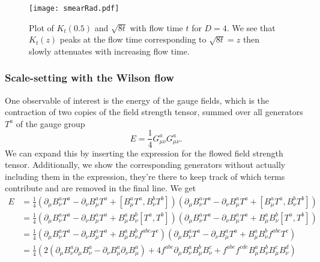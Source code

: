 \documentclass[a4paper,10pt]{article}
\begin{document}
\begin{figure}[H]
\centering

\texttt{[image: smearRad.pdf]}
\caption[]{Plot of $K_t(0.5)$ and $\sqrt{8t}$ with flow time $t$ for $D=4$. We see that $K_t(z)$ peaks at the flow time corresponding to $\sqrt{8t}=z$ then slowly attenuates with increasing flow time. }\label{fig:flowTimeMeanSquareRadius}
\end{figure}

\subsubsection{Scale-setting with the Wilson flow}
One observable of interest is the energy of the gauge fields, which is the contraction of two copies of the field strength tensor, summed over all generators $T^a$ of the gauge group 
\begin{equation}\label{eq:energyDensity_continuum}
E=\frac{1}{4} G_{\mu \nu}^{a} G_{\mu \nu}^{a}.
\end{equation}
We can expand this by inserting the expression for the flowed field strength tensor. Additionally, we show the corresponding generators without actually including them in the expression, they're there to keep track of which terms contribute and are removed in the final line. We get
\begin{equation}
\begin{aligned} 
E&=\frac{1}{4} \left( \partial_{\mu} B^{a}_{\nu}T^{a}-\partial_{\nu} B^{a}_{\mu}T^{a}+\left[B^{a}_{\mu}T^{a}, B^{b}_{\nu}T^{b}\right] \right)\left( \partial_{\mu} B^{a}_{\nu}T^{a}-\partial_{\nu} B^{a}_{\mu}T^{a}+\left[B^{a}_{\mu}T^{a}, B^{b}_{\nu}T^{b}\right] \right)\\
&=\frac{1}{4} \left( \partial_{\mu} B^{a}_{\nu}T^{a}-\partial_{\nu} B^{a}_{\mu}T^{a}+B^{a}_{\mu}B^{b}_{\nu}\left[T^{a}, T^{b}\right] \right)\left( \partial_{\mu} B^{a}_{\nu}T^{a}-\partial_{\nu} B^{a}_{\mu}T^{a}+B^{a}_{\mu}B^{b}_{\nu}\left[T^{a}, T^{b}\right] \right)\\
&=\frac{1}{4} \left( \partial_{\mu} B^{a}_{\nu}T^{a}-\partial_{\nu} B^{a}_{\mu}T^{a}+B^{a}_{\mu}B^{b}_{\nu}f^{a b c} T^{c} \right)\left( \partial_{\mu} B^{a}_{\nu}T^{a}-\partial_{\nu} B^{a}_{\mu}T^{a}+B^{a}_{\mu}B^{b}_{\nu}f^{a b c} T^{c} \right)\\
&=\frac{1}{4}  \left( 2\left(\partial_{\mu} B^{a}_{\nu}\partial_{\mu} B^{a}_{\nu}-\partial_{\nu} B^{a}_{\mu}\partial_{\nu} B^{a}_{\mu}\right)+4f^{a b c}\partial_{\mu} B^{a}_{\nu} B^{b}_{\mu}B^{c}_{\nu}  + f^{a b e} f^{cde}  B^{a}_{\mu}B^{b}_{\nu} B^{c}_{\mu}B^{d}_{\nu} \right)
\end{aligned}
\end{equation}
\end{document}
